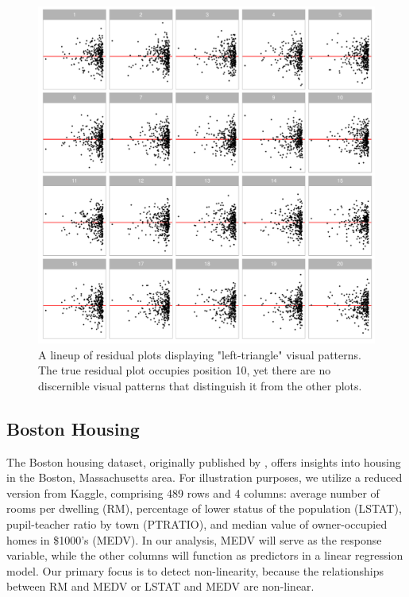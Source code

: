 \documentclass[]{interact}
\theoremstyle{plain}%
\theoremstyle{definition}
\theoremstyle{remark}
\begin{document}
\begin{figure}[!h]

{\centering \includegraphics[width=1\linewidth]{paper_files/figure-latex/false-lineup-1} 

}

\caption{A lineup of residual plots displaying "left-triangle" visual patterns. The true residual plot occupies position 10, yet there are no discernible visual patterns that distinguish it from the other plots.}\label{fig:false-lineup}
\end{figure}

\subsection{Boston Housing}\label{boston-housing}

The Boston housing dataset, originally published by
\citet{harrison1978hedonic}, offers insights into housing in the Boston,
Massachusetts area. For illustration purposes, we utilize a reduced
version from Kaggle, comprising 489 rows and 4 columns: average number
of rooms per dwelling (RM), percentage of lower status of the population
(LSTAT), pupil-teacher ratio by town (PTRATIO), and median value of
owner-occupied homes in \$1000's (MEDV). In our analysis, MEDV will
serve as the response variable, while the other columns will function as
predictors in a linear regression model. Our primary focus is to detect
non-linearity, because the relationships between RM and MEDV or LSTAT
and MEDV are non-linear.
\end{document}
